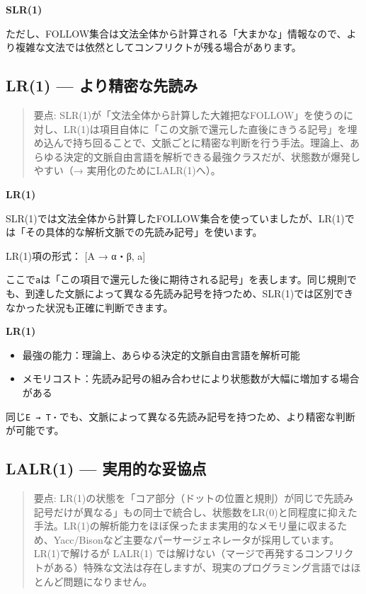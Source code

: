 \noindent\textbf{\sffamily SLR(1)}

ただし、FOLLOW集合は文法全体から計算される「大まかな」情報なので、より複雑な文法では依然としてコンフリクトが残る場合があります。

\subsection{LR(1) --- より精密な先読み}

\begin{quote}
要点:
SLR(1)が「文法全体から計算した大雑把なFOLLOW」を使うのに対し、LR(1)は項目自体に「この文脈で還元した直後にきうる記号」を埋め込んで持ち回ることで、文脈ごとに精密な判断を行う手法。理論上、あらゆる決定的文脈自由言語を解析できる最強クラスだが、状態数が爆発しやすい（→
実用化のためにLALR(1)へ）。
\end{quote}

\noindent\textbf{\sffamily LR(1)}

SLR(1)では文法全体から計算したFOLLOW集合を使っていましたが、LR(1)では「その具体的な解析文脈での先読み記号」を使います。

\begin{codescreen}{}
LR(1)項の形式： [A → α・β, a]
\end{codescreen}

ここで\texttt{a}は「この項目で還元した後に期待される記号」を表します。同じ規則でも、到達した文脈によって異なる先読み記号を持つため、SLR(1)では区別できなかった状況も正確に判断できます。

\noindent\textbf{\sffamily LR(1)}

\begin{itemize}
\item
  最強の能力：理論上、あらゆる決定的文脈自由言語を解析可能
\item
  メモリコスト：先読み記号の組み合わせにより状態数が大幅に増加する場合がある
\end{itemize}

同じ\texttt{E\ →\ T・}でも、文脈によって異なる先読み記号を持つため、より精密な判断が可能です。

\subsection{LALR(1) --- 実用的な妥協点}

\begin{quote}
要点:
LR(1)の状態を「コア部分（ドットの位置と規則）が同じで先読み記号だけが異なる」もの同士で統合し、状態数をLR(0)と同程度に抑えた手法。LR(1)の解析能力をほぼ保ったまま実用的なメモリ量に収まるため、Yacc/Bisonなど主要なパーサージェネレータが採用しています。LR(1)で解けるが
LALR(1)
では解けない（マージで再発するコンフリクトがある）特殊な文法は存在しますが、現実のプログラミング言語ではほとんど問題になりません。
\end{quote}

